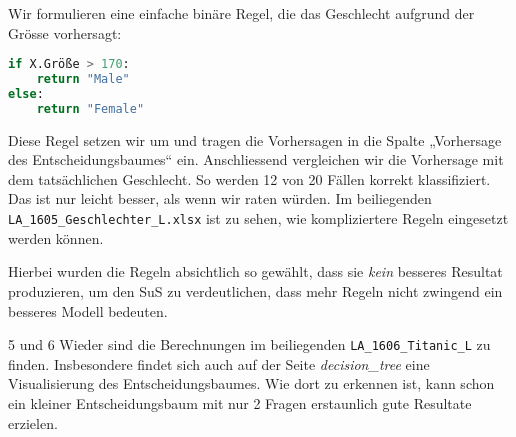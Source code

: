 \begin{aufgabe}{4}
Wir formulieren eine einfache binäre Regel, die das Geschlecht aufgrund der Grösse vorhersagt:

\begin{lstlisting}[language=Python]
if X.Größe > 170:
    return "Male"
else:
    return "Female"
\end{lstlisting}

Diese Regel setzen wir um und tragen die Vorhersagen in die Spalte „Vorhersage des Entscheidungsbaumes“ ein. Anschliessend vergleichen wir die Vorhersage mit dem tatsächlichen Geschlecht. So werden 12 von 20 Fällen korrekt klassifiziert. Das ist nur leicht besser, als wenn wir raten würden. Im beiliegenden \texttt{LA\_1605\_Geschlechter\_L.xlsx} ist zu sehen, wie kompliziertere Regeln eingesetzt werden können. 
\end{aufgabe}

Hierbei wurden die Regeln absichtlich so gewählt, dass sie \textit{kein} besseres Resultat produzieren, um den SuS zu verdeutlichen, dass mehr Regeln nicht zwingend ein besseres Modell bedeuten.

\begin{aufgabe}{5 und 6}
Wieder sind die Berechnungen im beiliegenden \texttt{LA\_1606\_Titanic\_L} zu finden. Insbesondere findet sich auch auf der Seite \textit{decision\_tree} eine Visualisierung des Entscheidungsbaumes. Wie dort zu erkennen ist, kann schon ein kleiner Entscheidungsbaum mit nur 2 Fragen erstaunlich gute Resultate erzielen.
\end{aufgabe}

